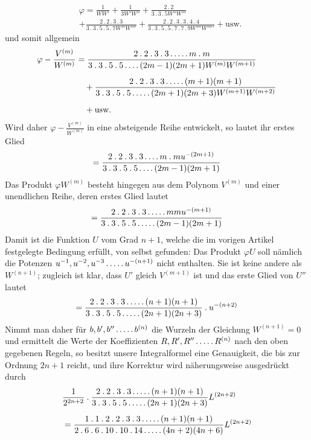 \[
\begin{aligned}&\varphi=\frac1{WW'}+\frac1{3W'W''}+\frac{2\mathbin{.}2}{3\mathbin{.}3\mathbin{.}5W''W'''}\\[5pt]&+\frac{2\mathbin{.}2\mathbin{.}3\mathbin{.}3}{3\mathbin{.}3\mathbin{.}5\mathbin{.}5\mathbin{.}7W'''W''''}+\frac{2\mathbin{.}2\mathbin{.}3\mathbin{.}3\mathbin{.}4\mathbin{.}4}{3\mathbin{.}3\mathbin{.}5\mathbin{.}5\mathbin{.}7\mathbin{.}7\mathbin{.}9W''''W'''''}+\text{usw.}\end{aligned}
\]
und somit allgemein
\[
\begin{aligned}
\varphi-\frac{V^{(m)}}{W^{(m)}}&=\frac{2\mathbin{.}2\mathbin{.}3\mathbin{.}3\mathinner{.\,.\,.\,.\,.} m\mathbin{.}m}{3\mathbin{.}3\mathbin{.}5\mathbin{.}5\mathinner{.\,.\,.\,.}(2m-1)(2m+1)W^{(m)}W^{(m+1)}}\\[5pt]
&\quad+\frac{2\mathbin{.}2\mathbin{.}3\mathbin{.}3\mathinner{.\,.\,.\,.\,.}(m+1)(m+1)}{3\mathbin{.}3\mathbin{.}5\mathbin{.}5\mathinner{.\,.\,.\,.\,.}(2m+1)(2m+3)W^{(m+1)}W^{(m+2)}}\\[5pt]
&\quad+\text{usw.}
\end{aligned}
\]
Wird daher $\varphi-\frac{V^{(m)}}{W^{(m)}}$ in eine absteigende Reihe entwickelt, so lautet ihr erstes Glied
\[
=\frac{2\mathbin{.}2\mathbin{.}3\mathbin{.}3\mathinner{.\,.\,.\,.} m\mathbin{.}m u^{-(2m+1)}}{3\mathbin{.}3\mathbin{.}5\mathbin{.}5\mathinner{.\,.\,.\,.}(2m-1)(2m+1)}
\]
Das Produkt $\varphi W^{(m)}$ besteht hingegen aus dem Polynom $V^{(m)}$ und einer unendlichen Reihe, deren erstes Glied lautet
\[
=\frac{2\mathbin{.}2\mathbin{.}3\mathbin{.}3\mathinner{.\,.\,.\,.\,.} mmu^{-(m+1)}}{3\mathbin{.}3\mathbin{.}5\mathbin{.}5\mathinner{.\,.\,.\,.\,.}(2m-1)(2m+1)}
\]
Damit ist die Funktion $U$ vom Grad $n+1$, welche die im vorigen Artikel festgelegte Bedingung erfüllt, von selbst gefunden: Das Produkt $\varphi U$ soll nämlich die Potenzen $u^{-1},u^{-2},u^{-3}\mathinner{.\,.\,.\,.\,.} u^{-(n+1)}$ nicht enthalten. Sie ist keine andere als $W^{(n+1)}$; zugleich ist klar, dass $U'$ gleich $V^{(m+1)}$ ist und das erste Glied von $U''$ lautet
\[
=\frac{2\mathbin{.}2\mathbin{.}3\mathbin{.}3\mathinner{.\,.\,.\,.\,.}(n+1)(n+1)}{3\mathbin{.}3\mathbin{.}5\mathbin{.}5\mathinner{.\,.\,.\,.\,.}(2n+1)(2n+3)}\mathbin{.}u^{-(n+2)}
\]
Nimmt man daher für $b,b',b''\mathinner{.\,.\,.\,.\,.} b^{(n)}$ die Wurzeln der Gleichung $W^{(n+1)}=0$ und ermittelt die Werte der Koeffizienten $R,R',R''\mathinner{.\,.\,.\,.\,.} R^{(n)}$ nach den oben gegebenen Regeln, so besitzt unsere Integralformel eine Genauigkeit, die bis zur Ordnung $2n+1$ reicht, und ihre Korrektur wird näherungsweise ausgedrückt durch
\[
\begin{aligned}&\frac1{2^{2n+2}}\mathbin{.}\frac{2\mathbin{.}2\mathbin{.}3\mathbin{.}3\mathinner{.\,.\,.\,.\,.}(n+1)(n+1)}{3\mathbin{.}3\mathbin{.}5\mathbin{.}5\mathinner{.\,.\,.\,.\,.}(2n+1)(2n+3)}L^{(2n+2)}\\[5pt]&=\frac{1\mathbin{.}1\mathbin{.}2\mathbin{.}2\mathbin{.}3\mathbin{.}3\mathinner{.\,.\,.\,.\,.}(n+1)(n+1)}{2\mathbin{.}6\mathbin{.}6\mathbin{.}10\mathbin{.}10\mathbin{.}14\mathinner{.\,.\,.\,.\,.}(4n+2)(4n+6)}L^{(2n+2)}\end{aligned}
\]
